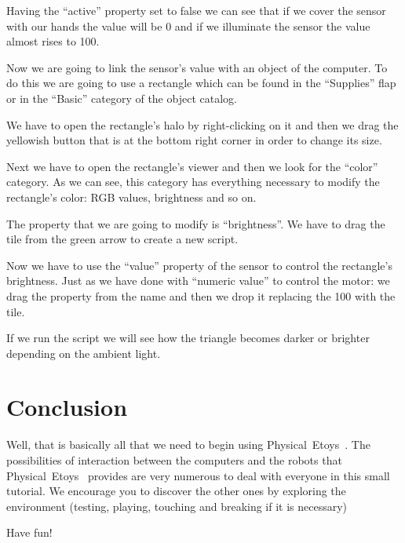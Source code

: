 \documentclass[english]{etoys-guide}
\def\appName{Physical~Etoys~}
\begin{document}
Having the “active” property set to false we can see that if we cover the
sensor with our hands the value will be 0 and if we illuminate the sensor the
value almost rises to 100. 

Now we are going to link the sensor’s value with an object of the computer. To
do this we are going to use a rectangle which can be found in the “Supplies”
	flap or in the “Basic” category of the object catalog. 



We have to open the rectangle’s halo by right-clicking on it and then we drag
the yellowish button that is at the bottom right corner in order to change its
size. 



Next we have to open the rectangle’s viewer and then we look for the “color”
category. As we can see, this category has everything necessary to modify the
rectangle’s color: RGB values, brightness and so on. 



The property that we are going to modify is “brightness”. We have to drag the
tile from the green arrow to create a new script. 



Now we have to use the “value” property of the sensor to control the
rectangle’s brightness. Just as we have done with “numeric value” to control
the motor: we drag the property from the name and then we drop it replacing the
100 with the tile.


If we run the script we will see how the triangle becomes darker or brighter
depending on the ambient light. 



\section{Conclusion}

Well, that is basically all that we need to begin using \appName. The
possibilities of interaction between the computers and the robots that \appName
provides are very numerous to deal with everyone in this small tutorial. We
encourage you to discover the other ones by exploring the environment (testing,
playing, touching and breaking if it is necessary) 

Have fun!
\end{document}
